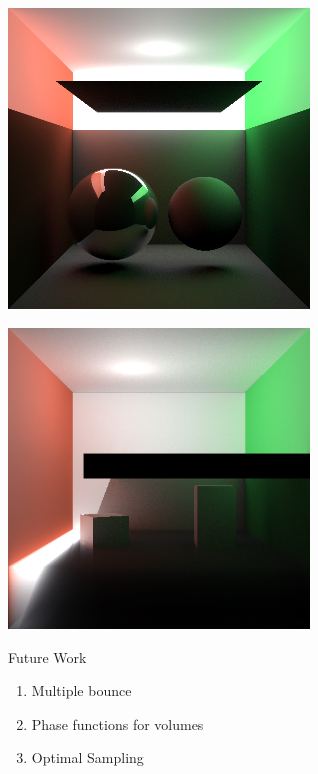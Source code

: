 \documentclass[10pt,compress,professionalfont]{beamer}
\begin{document}
\begin{frame}[c]{}

    {\centering
    \includegraphics[width=80mm]{../img/two_sphere_indir}\\
    }

\end{frame}




\begin{frame}[c]{}

    {\centering
    \includegraphics[width=80mm]{../img/one_side_corrected}\\
    }

\end{frame}



\begin{frame}{Future Work}

    \begin{enumerate}
        \item Multiple bounce
        \item Phase functions for volumes
        \item Optimal Sampling
    \end{enumerate}

\end{frame}
\end{document}
